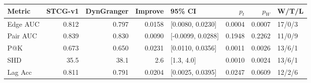 \begin{tabular}{lrrrlrrl}
\toprule
Metric & STCG-v1 & DynGranger & Improve & 95\% CI & $p_t$ & $p_W$ & W/T/L \\
\midrule
Edge AUC & 0.812 & 0.797 & 0.0158 & [0.0080, 0.0230] & 0.0004 & 0.0007 & 17/0/3 \\
Pair AUC & 0.839 & 0.830 & 0.0090 & [-0.0099, 0.0288] & 0.1948 & 0.2262 & 11/0/9 \\
P@K & 0.673 & 0.650 & 0.0231 & [0.0110, 0.0356] & 0.0011 & 0.0026 & 13/6/1 \\
SHD & 35.5 & 38.1 & 2.6 & [1.3, 4.0] & 0.0010 & 0.0024 & 13/6/1 \\
Lag Acc & 0.811 & 0.791 & 0.0204 & [0.0025, 0.0395] & 0.0247 & 0.0609 & 12/2/6 \\
\bottomrule
\end{tabular}
